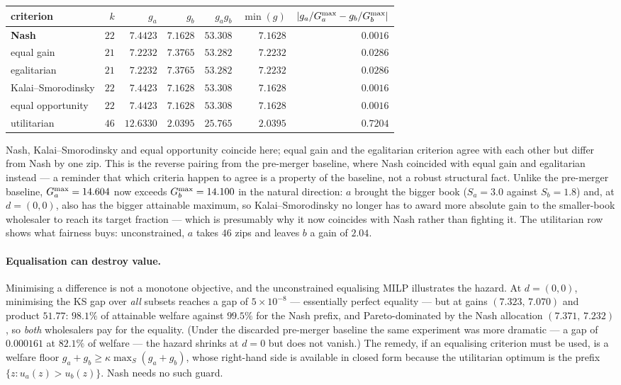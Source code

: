 \documentclass[11pt]{article}
\theoremstyle{remark}\newtheorem*{remark}{Remark}
\begin{document}
\begin{center}\begin{tabular}{lrrrrrr}\toprule
\textbf{criterion} & $k$ & $g_a$ & $g_b$ & $g_ag_b$ & $\min(g)$ & $|g_a/G_a^{\max}-g_b/G_b^{\max}|$\\
\midrule
\textbf{Nash} & $22$ & $7.4423$ & $7.1628$ & $\mathbf{53.308}$ & $7.1628$ & $0.0016$\\
equal gain & $21$ & $7.2232$ & $7.3765$ & $53.282$ & $7.2232$ & $0.0286$\\
egalitarian & $21$ & $7.2232$ & $7.3765$ & $53.282$ & $7.2232$ & $0.0286$\\
Kalai--Smorodinsky & $22$ & $7.4423$ & $7.1628$ & $53.308$ & $7.1628$ & $0.0016$\\
equal opportunity & $22$ & $7.4423$ & $7.1628$ & $53.308$ & $7.1628$ & $0.0016$\\
utilitarian & $46$ & $12.6330$ & $2.0395$ & $25.765$ & $2.0395$ & $0.7204$\\
\bottomrule\end{tabular}\end{center}

\noindent Nash, Kalai--Smorodinsky and equal opportunity coincide here; equal gain and
the egalitarian criterion agree with each other but differ from Nash by one zip. This is
the reverse pairing from the pre-merger baseline, where Nash coincided with equal gain
and egalitarian instead --- a reminder that which criteria happen to agree is a property
of the baseline, not a robust structural fact. Unlike the pre-merger baseline,
$G_a^{\max}=14.604$ now exceeds $G_b^{\max}=14.100$ in the natural direction: $a$ brought the
bigger book ($S_a=3.0$ against $S_b=1.8$) and, at $d=(0,0)$, also has the bigger
attainable maximum, so Kalai--Smorodinsky no longer has to award more absolute gain to
the smaller-book wholesaler to reach its target fraction --- which is presumably why it
now coincides with Nash rather than fighting it. The utilitarian row shows what fairness
buys: unconstrained, $a$ takes $46$ zips and leaves $b$ a gain of $2.04$.

\paragraph{Equalisation can destroy value.} Minimising a difference is not a monotone
objective, and the unconstrained equalising MILP illustrates the hazard. At $d=(0,0)$,
minimising the KS gap over \emph{all} subsets reaches a gap of $5\times10^{-8}$ ---
essentially perfect equality --- but at gains $(7.323,\,7.070)$ and product $51.77$:
$98.1\%$ of attainable welfare against $99.5\%$ for the Nash prefix, and
Pareto-dominated by the Nash allocation $(7.371,\,7.232)$, so \emph{both} wholesalers
pay for the equality. (Under the discarded pre-merger baseline the same experiment was
more dramatic --- a gap of $0.000161$ at $82.1\%$ of welfare --- the hazard shrinks at
$d=0$ but does not vanish.) The remedy, if an equalising criterion must be used, is a
welfare floor $g_a+g_b\ge\kappa\max_S(g_a+g_b)$, whose right-hand side is available in
closed form because the utilitarian optimum is the prefix $\{z:u_a(z)>u_b(z)\}$. Nash
needs no such guard.
\end{document}
